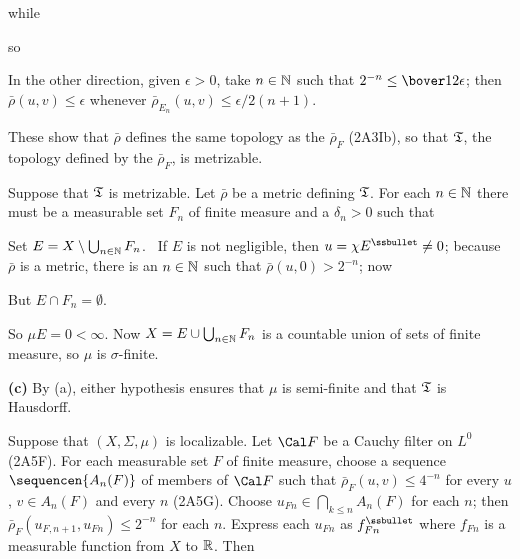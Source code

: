 {

\noindent while



\noindent so


In the other direction, given $\epsilon>0$, take $n\in\Bbb N$ such that
$2^{-n}\le\bover12\epsilon$;  then $\bar\rho(u,v)\le\epsilon$ whenever
$\bar\rho_{E_n}(u,v)\le\epsilon/2(n+1)$.

These show that $\bar\rho$ defines the same topology as the
$\bar\rho_F$ (2A3Ib), so that $\frak T$, the topology defined by the
$\bar\rho_F$, is
metrizable.

\medskip

 Suppose that $\frak T$ is metrizable.    Let
$\bar\rho$ be a
metric defining $\frak T$.   For each $n\in\Bbb N$ there must be a
measurable set $F_n$ of finite measure and a $\delta_n>0$ such that


\noindent Set $E=X\setminus\bigcup_{n\in\Bbb N}F_n$.   \Quer\ If $E$ is
not negligible, then $u=\chi E^{\ssbullet}\ne 0$;  because $\bar\rho$
is a metric, there is an $n\in\Bbb N$ such that $\bar\rho(u,0)>2^{-n}$;
now



\noindent But $E\cap F_n=\emptyset$.\ \Bang

So $\mu E=0<\infty$.
Now $X=E\cup\bigcup_{n\in\Bbb N}F_n$ is a countable union of sets of
finite measure, so $\mu$ is $\sigma$-finite.

\medskip

{\bf (c)} By (a), either hypothesis ensures that $\mu$ is semi-finite
and that $\frak T$ is Hausdorff.

\medskip

 Suppose that $(X,\Sigma,\mu)$ is localizable.   Let
$\Cal F$ be a Cauchy filter on $L^0$ (2A5F).   For each measurable set
$F$ of finite measure, choose a sequence $\sequencen{A_n(F)}$ of members
of $\Cal F$ such that $\bar\rho_F(u,v)\le 4^{-n}$ for every $u$,
$v\in A_n(F)$ and
every $n$ (2A5G).   Choose $u_{Fn}\in\bigcap_{k\le n}A_n(F)$ for each
$n$;  then $\bar\rho_F(u_{F,n+1},u_{Fn})\le 2^{-n}$ for each $n$.
Express each
$u_{Fn}$ as $f_{Fn}^{\ssbullet}$ where $f_{Fn}$ is a measurable function
from $X$ to $\Bbb R$.   Then

}
